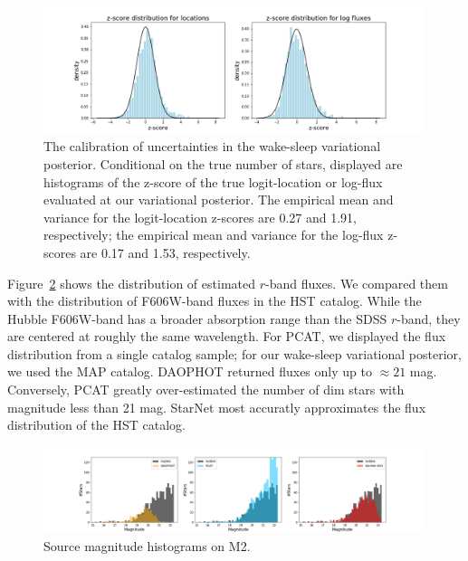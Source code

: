 \begin{figure}[ht]
    \centering
    \includegraphics[width=0.99\textwidth]{figures/z-score_calibration.png}
    \caption{The calibration of uncertainties in the wake-sleep variational posterior. 
    Conditional on the true number of stars, displayed are histograms of the z-score of the true logit-location or log-flux evaluated at our variational posterior. 
    The empirical mean and variance for the logit-location z-scores are 0.27 and 1.91, respectively; the empirical mean and variance for the log-flux z-scores are 0.17 and 1.53, respectively. 
}
    \label{fig:z-score_calibration}
\end{figure}

Figure~\ref{fig:luminosity_fun_m2} shows the distribution of estimated $r$-band fluxes. We compared them 
with the distribution of F606W-band fluxes in the HST catalog. While the Hubble F606W-band has a broader absorption range than the SDSS $r$-band, they are centered at roughly the same wavelength. For PCAT, we displayed the flux distribution from a single catalog sample; for our wake-sleep variational 
posterior, we used the MAP catalog. DAOPHOT returned fluxes only up to $\approx21$ mag.
Conversely, PCAT greatly over-estimated the number of dim stars with magnitude less than 21 mag. StarNet most accuratly approximates the flux distribution of the HST catalog. 

\begin{figure}[ht]
    \centering
    \includegraphics[width=0.99\textwidth]{figures/luminosity_fun.png}
    \caption{Source magnitude histograms on M2. }
    \label{fig:luminosity_fun_m2}
\end{figure}

